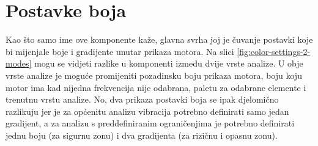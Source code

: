 \documentclass[times, utf8, diplomski]{fer}
\begin{document}
\section{Postavke boja} \label{color-settings-section}
Kao što samo ime ove komponente kaže, glavna svrha joj je čuvanje postavki koje bi mijenjale boje i gradijente unutar prikaza motora. Na slici \ref{fig:color-settings-2-modes} mogu se vidjeti razlike u komponenti između dvije vrste analize. U obje vrste analize je moguće promijeniti pozadinsku boju prikaza motora, boju koju motor ima kad nijedna frekvencija nije odabrana, paletu za odabrane elemente i trenutnu vrstu analize. No, dva prikaza postavki boja se ipak djelomično razlikuju jer je za općenitu analizu vibracija potrebno definirati samo jedan gradijent, a za analizu s preddefiniranim ograničenjima je potrebno definirati jednu boju (za sigurnu zonu) i dva gradijenta (za rizičnu i opasnu zonu).
\end{document}
